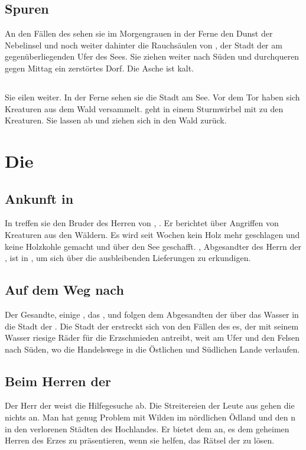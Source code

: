 \documentclass[12pt,a4paper,onecolumn,oneside,ngerman]{book}
\begin{document}
\chapter{Spuren}
An den Fällen des {\Dreifluss} sehen sie im Morgengrauen in der Ferne den Dunst der Nebelinsel und noch weiter dahinter die Rauchsäulen von {\Dariom}, der Stadt der {\Eisenmeister} am gegenüberliegenden Ufer des Sees.\linebreak
Sie ziehen weiter nach Süden und durchqueren gegen Mittag ein zerstörtes Dorf. Die Asche ist kalt.

\chapter{\Braucheln}
Sie eilen weiter. In der Ferne sehen sie die Stadt {\Braucheln} am See. Vor dem Tor haben sich Kreaturen aus dem Wald versammelt. {\Sena} geht in einem Sturmwirbel mit {\Papato} zu den Kreaturen. Sie lassen ab und ziehen sich in den Wald zurück.

\part{Die {\Eisenmeister}}
\chapter{Ankunft in {\Braucheln}}
In {\Braucheln} treffen sie den Bruder des Herren von {\Rhingell}, {\Kalemus}. Er berichtet über Angriffen von Kreaturen aus den Wäldern. Es wird seit Wochen kein Holz mehr geschlagen und keine Holzkohle gemacht und über den See geschafft. {\Safir}, Abgesandter des Herrn der {\Eisenmeister}, ist in {\Braucheln}, um sich über die ausbleibenden Lieferungen zu erkundigen.

\chapter{Auf dem Weg nach \Dariom}
Der Gesandte, einige {\Schattenlaufer}, das {\Sturmkind}, {\Molitor} und \Papato folgen dem Abgesandten der {\Eisenmeister} über das Wasser in die Stadt der {\Eisenmeister}.\linebreak
Die Stadt der {\Eisenmeister} erstreckt sich von den Fällen des {\Dreifluss}es, der mit seinem Wasser riesige Räder für die Erzschmieden antreibt, weit am Ufer und den Felsen nach Süden, wo die Handelswege in die Östlichen und Südlichen Lande verlaufen.

\chapter{Beim Herren der {\Eisenmeister}}
Der Herr der {\Eisenmeister} weist die Hilfegesuche ab. Die Streitereien der Leute aus {\Rhingell}  gehen die {\Eisenmeister} nichts an. Man hat genug Problem mit Wilden im nördlichen Ödland und den {\Staubteufel}n in den verlorenen Städten des Hochlandes.\linebreak 
Er bietet dem {\Sturmkind} an, es dem geheimen Herren des Erzes zu präsentieren, wenn sie helfen, das Rätsel der \Staubteufel zu lösen.
\end{document}
